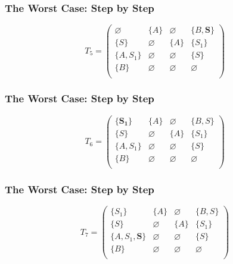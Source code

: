 \documentclass[xcolor=table]{beamer}
\begin{document}
\begin{frame}[noframenumbering]
  \transwipe[direction=90]
  \frametitle{The Worst Case: Step by Step}
\begin{figure}[h]
\[
T_5 = \begin{pmatrix}
\varnothing & \{A\}       & \varnothing & \{B, \pmb{S}\}    \\
\{S\}       & \varnothing & \{A\}       & \{S_1\}     \\
\{A, S_1\}  & \varnothing & \varnothing & \{S\}       \\
\{B\}       & \varnothing & \varnothing & \varnothing \\
\end{pmatrix}
\]
\label{ExampleQueryFirstIteration}
\end{figure}
\end{frame} 

\begin{frame}[noframenumbering]
  \transwipe[direction=90]
  \frametitle{The Worst Case: Step by Step}
\begin{figure}[h]
\[
T_6 = \begin{pmatrix}
\{\pmb{S_1}\}     & \{A\}       & \varnothing & \{B, S\}    \\
\{S\}       & \varnothing & \{A\}       & \{S_1\}     \\
\{A, S_1\}  & \varnothing & \varnothing & \{S\}       \\
\{B\}       & \varnothing & \varnothing & \varnothing \\
\end{pmatrix}
\]
\label{ExampleQueryFirstIteration}
\end{figure}
\end{frame} 

\begin{frame}[noframenumbering]
  \transwipe[direction=90]
  \frametitle{The Worst Case: Step by Step}
\begin{figure}[h]
\[
T_7 = \begin{pmatrix}
\{S_1\}     & \{A\}       & \varnothing & \{B, S\}    \\
\{S\}       & \varnothing & \{A\}       & \{S_1\}     \\
\{A, S_1, \pmb{S}\}  & \varnothing & \varnothing & \{S\}    \\
\{B\}       & \varnothing & \varnothing & \varnothing \\
\end{pmatrix}
\]
\label{ExampleQueryFirstIteration}
\end{figure}
\end{frame} 
\end{document}
